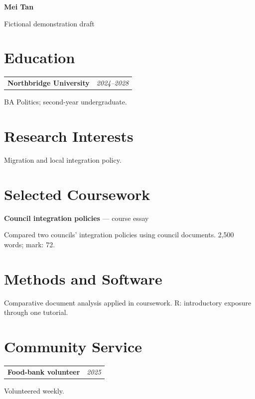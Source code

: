 \documentclass[10pt,a4paper]{article}
\makeatletter
\newcommand{\datedline}[2]{%
  \begin{tabularx}{\textwidth}{@{}Xr@{}}
    #1 & \textit{#2}
  \end{tabularx}%
}
\makeatother
\begin{document}
\fontsize{10.2pt}{11.3pt}\selectfont
\begin{center}{\fontsize{19pt}{20pt}\selectfont\bfseries Mei Tan}\par\small Fictional demonstration draft\end{center}
\section{Education}
\datedline{\textbf{Northbridge University}}{2024--2028}
BA Politics; second-year undergraduate.
\section{Research Interests}
Migration and local integration policy.
\section{Selected Coursework}
\textbf{Council integration policies} --- course essay\par
Compared two councils' integration policies using council documents. 2,500 words; mark: 72.
\section{Methods and Software}
Comparative document analysis applied in coursework. R: introductory exposure through one tutorial.
\section{Community Service}
\datedline{\textbf{Food-bank volunteer}}{2025}
Volunteered weekly.
\end{document}
